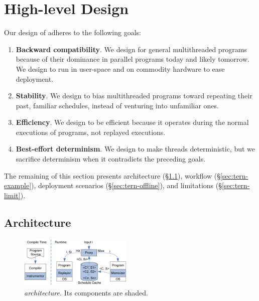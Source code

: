 \section{High-level Design}\label{sec:tern-design}


Our design of \tern adheres to the following goals:

\begin{enumerate}

\item {\bf Backward compatibility}.  We design \tern for general
  multithreaded programs because of their dominance in parallel programs
  today and likely tomorrow.  We design \tern to run in user-space and on
  commodity hardware to ease deployment.

\item {\bf Stability}.  We design \tern to bias multithreaded programs
  toward repeating their past, familiar schedules, instead of venturing
  into unfamiliar ones.

\item {\bf Efficiency}.  We design \tern to be efficient because it
  operates during the normal executions of programs, not replayed
  executions.

\item {\bf Best-effort determinism}.  We design \tern to make threads
  deterministic, but we sacrifice determinism when it contradicts the
  preceding goals.

\end{enumerate}

The remaining of this section presents architecture
(\S\ref{sec:tern-arch}), workflow (\S\ref{sec:tern-example}), deployment
scenarios (\S\ref{sec:tern-offline}), and limitations (\S\ref{sec:tern-limit}).



\subsection{Architecture} \label{sec:tern-arch}

\begin{figure}[t]
\begin{center}
\includegraphics[width=0.48\textwidth]{tern/figures/overview.eps}
\end{center}
\caption{\emph{\tern architecture.} Its components are shaded.}
\label{fig:tern-overview}
\end{figure}

